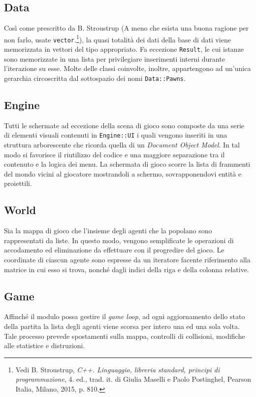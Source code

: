\documentclass[a4paper]{article}
\begin{document}
\subsection{Data}

Così come prescritto da B. Stroustrup (\guillemotleft A meno che esista una buona ragione per
non farlo, usate \verb!vector!.\guillemotright\footnote{\label{note1} Vedi B.
Stroustrup, \emph{C++. Linguaggio, libreria standard, principi di
programmazione}, 4. ed., trad. it. di Giulia Maselli e Paolo Postinghel, Pearson
Italia, Milano, 2015, p. 810.}), la quasi totalità dei dati della base di
dati viene memorizzata in vettori del tipo appropriato. Fa eccezione
\verb!Result!, le cui istanze sono memorizzate in una lista per privilegiare
inserimenti interni durante l'iterazione su esse. Molte delle classi coinvolte,
inoltre, appartengono ad un'unica gerarchia circoscritta dal sottospazio dei
nomi \verb!Data::Pawns!.

\subsection{Engine}

Tutti le schermate ad eccezione della scena di gioco sono composte da una serie
di elementi visuali contenuti in \verb!Engine::UI! i quali vengono inseriti in
una struttura arborescente che ricorda quella di un \emph{Document Object Model}.
In tal modo si favorisce il riutilizzo del codice e una maggiore separazione
tra il contenuto e la logica dei menu.
La schermata di gioco scorre la lista di frammenti del mondo vicini al giocatore
mostrandoli a schermo, sovrapponendovi entit\`a e proiettili.

\subsection{World}

Sia la mappa di gioco che l'insieme degli agenti che la popolano sono
rappresentati da liste. In questo modo, vengono semplificate le operazioni di
accodamento ed eliminazione da effettuare con il progredire del gioco. Le
coordinate di ciascun agente sono espresse da un iteratore facente riferimento
alla matrice in cui esso si trova, nonch\'e dagli indici della riga e della
colonna relative.

\subsection{Game}

Affinch\'e il modulo possa gestire il \emph{game loop}, ad ogni aggiornamento
dello stato della partita la lista degli agenti viene scorsa per intero una ed
una sola volta. Tale processo prevede spostamenti sulla mappa, controlli di
collisioni, modifiche alle statistice e distruzioni.
\end{document}
